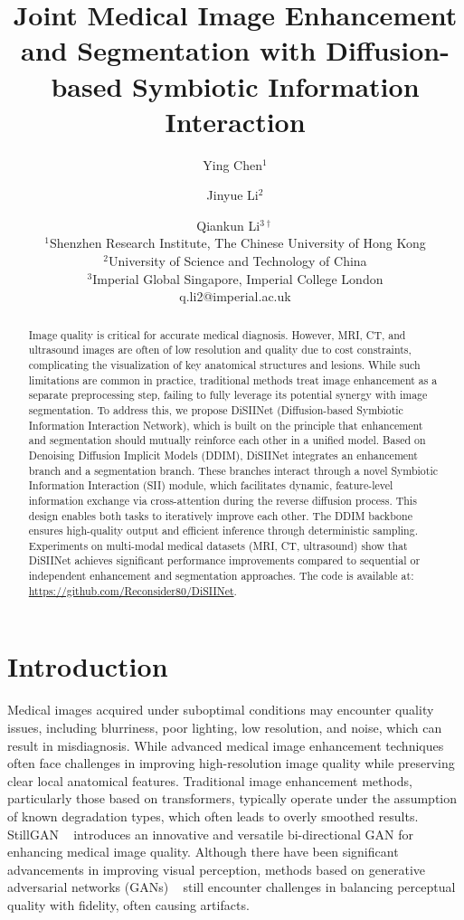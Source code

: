 \documentclass{article}
\title{Joint Medical Image Enhancement and Segmentation with Diffusion-based Symbiotic Information Interaction}
\author{
Ying Chen$^1$
\and
Jinyue Li$^2$
\and
Qiankun Li$^{3\dagger}$\\
\affiliations
$^1$Shenzhen Research Institute, The Chinese University of Hong Kong\\
$^2$University of Science and Technology of China\\
$^3$Imperial Global Singapore, Imperial College London\\
\emails
q.li2@imperial.ac.uk
}
\begin{document}
\maketitle
{}

\begin{abstract}
Image quality is critical for accurate medical diagnosis. However, MRI, CT, and ultrasound images are often of low resolution and quality due to cost constraints, complicating the visualization of key anatomical structures and lesions. While such limitations are common in practice, traditional methods treat image enhancement as a separate preprocessing step, failing to fully leverage its potential synergy with image segmentation. To address this, we propose DiSIINet (Diffusion-based Symbiotic Information Interaction Network), which is built on the principle that enhancement and segmentation should mutually reinforce each other in a unified model. Based on Denoising Diffusion Implicit Models (DDIM), DiSIINet integrates an enhancement branch and a segmentation branch. These branches interact through a novel Symbiotic Information Interaction (SII) module, which facilitates dynamic, feature-level information exchange via cross-attention during the reverse diffusion process. This design enables both tasks to iteratively improve each other. The DDIM backbone ensures high-quality output and efficient inference through deterministic sampling. Experiments on multi-modal medical datasets (MRI, CT, ultrasound) show that DiSIINet achieves significant performance improvements compared to sequential or independent enhancement and segmentation approaches. The code is available at: \url{https://github.com/Reconsider80/DiSIINet}.
\end{abstract}

\section{Introduction}

Medical images acquired under suboptimal conditions may encounter quality issues, including blurriness, poor lighting, low resolution, and noise, which can result in misdiagnosis. While advanced medical image enhancement techniques often face challenges in improving high-resolution image quality while preserving clear local anatomical features. Traditional image enhancement methods, particularly those based on transformers, typically operate under the assumption of known degradation types, which often leads to overly smoothed results. StillGAN ~\cite{ma2021structure} introduces an innovative and versatile bi-directional GAN for enhancing medical image quality. Although there have been significant advancements in improving visual perception, methods based on generative adversarial networks (GANs) ~\cite{liang2022efficient,park2023content} still encounter challenges in balancing perceptual quality with fidelity, often causing artifacts. 
 
\end{document}
